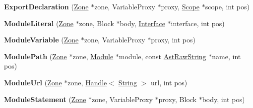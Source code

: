\begin{DoxyCompactItemize}
\item 
\hypertarget{classv8_1_1internal_1_1_v8___f_i_n_a_l_abf7c0428e070e246fbcc722b1d5a4bbc}{}{\bfseries Export\+Declaration} (\hyperlink{classv8_1_1internal_1_1_zone}{Zone} $\ast$zone, Variable\+Proxy $\ast$proxy, \hyperlink{classv8_1_1internal_1_1_v8___f_i_n_a_l_1_1_scope}{Scope} $\ast$scope, int pos)\label{classv8_1_1internal_1_1_v8___f_i_n_a_l_abf7c0428e070e246fbcc722b1d5a4bbc}

\item 
\hypertarget{classv8_1_1internal_1_1_v8___f_i_n_a_l_a111fc5fa2ba9c9a805926e9618f90b57}{}{\bfseries Module\+Literal} (\hyperlink{classv8_1_1internal_1_1_zone}{Zone} $\ast$zone, Block $\ast$body, \hyperlink{classv8_1_1internal_1_1_interface}{Interface} $\ast$interface, int pos)\label{classv8_1_1internal_1_1_v8___f_i_n_a_l_a111fc5fa2ba9c9a805926e9618f90b57}

\item 
\hypertarget{classv8_1_1internal_1_1_v8___f_i_n_a_l_a1cb64fb0f3975e63cd131797b9dad644}{}{\bfseries Module\+Variable} (\hyperlink{classv8_1_1internal_1_1_zone}{Zone} $\ast$zone, Variable\+Proxy $\ast$proxy, int pos)\label{classv8_1_1internal_1_1_v8___f_i_n_a_l_a1cb64fb0f3975e63cd131797b9dad644}

\item 
\hypertarget{classv8_1_1internal_1_1_v8___f_i_n_a_l_abdc275c5faee94f04634037ed9ff8103}{}{\bfseries Module\+Path} (\hyperlink{classv8_1_1internal_1_1_zone}{Zone} $\ast$zone, \hyperlink{classv8_1_1internal_1_1_module}{Module} $\ast$module, const \hyperlink{classv8_1_1internal_1_1_ast_raw_string}{Ast\+Raw\+String} $\ast$name, int pos)\label{classv8_1_1internal_1_1_v8___f_i_n_a_l_abdc275c5faee94f04634037ed9ff8103}

\item 
\hypertarget{classv8_1_1internal_1_1_v8___f_i_n_a_l_a578775e917dbdfd5e188a61cd23fd601}{}{\bfseries Module\+Url} (\hyperlink{classv8_1_1internal_1_1_zone}{Zone} $\ast$zone, \hyperlink{classv8_1_1internal_1_1_handle}{Handle}$<$ \hyperlink{classv8_1_1internal_1_1_string}{String} $>$ url, int pos)\label{classv8_1_1internal_1_1_v8___f_i_n_a_l_a578775e917dbdfd5e188a61cd23fd601}

\item 
\hypertarget{classv8_1_1internal_1_1_v8___f_i_n_a_l_a7d3dee79ba322585d4431c66191e3b76}{}{\bfseries Module\+Statement} (\hyperlink{classv8_1_1internal_1_1_zone}{Zone} $\ast$zone, Variable\+Proxy $\ast$proxy, Block $\ast$body, int pos)\label{classv8_1_1internal_1_1_v8___f_i_n_a_l_a7d3dee79ba322585d4431c66191e3b76}


\end{DoxyCompactItemize}

